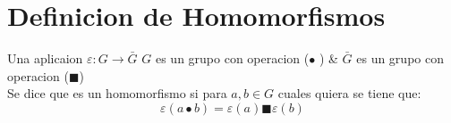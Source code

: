 \section{Definicion de Homomorfismos } 
	\begin{definicion}
	Una aplicaion $\varepsilon :G\rightarrow \bar{G} $ $G$ es un grupo con operacion ($\bullet$ ) \& $\bar{G} $ es un grupo con operacion ($\blacksquare $) \\

	Se dice que es un homomorfismo si para $a,b\in  G$ cuales quiera se tiene que:
	  \begin{equation}
	    \varepsilon (a\bullet b)=\varepsilon (a)\blacksquare \varepsilon (b) 
	  \end{equation}
	\end{definicion} 
	
